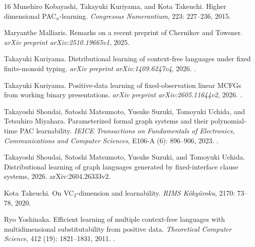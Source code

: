 \documentclass[11pt]{article}
\theoremstyle{definition}
\theoremstyle{remark}
\begin{document}
\begin{thebibliography}{16}
Munehiro Kobayashi, Takayuki Kuriyama, and Kota Takeuchi.
\newblock Higher dimensional {PAC}$_n$-learning.
\newblock \emph{Congressus Numerantium}, 223: 227--236, 2015.

Maryanthe Malliaris.
\newblock Remarks on a recent preprint of Chernikov and Towsner.
\newblock \emph{arXiv preprint arXiv:2510.19665v1}, 2025.

Takayuki Kuriyama.
\newblock Distributional learning of context-free languages under fixed
  finite-monoid typing.
\newblock \emph{arXiv preprint arXiv:1409.6247v4}, 2026.
\newblock {}.

Takayuki Kuriyama.
\newblock Positive-data learning of fixed-observation linear {MCFG}s from
  working binary presentations.
\newblock \emph{arXiv preprint arXiv:2605.11644v2}, 2026.
\newblock {}.

Takayoshi Shoudai, Satoshi Matsumoto, Yusuke Suzuki, Tomoyuki Uchida, and
Tetsuhiro Miyahara.
\newblock Parameterized formal graph systems and their polynomial-time {PAC}
  learnability.
\newblock \emph{IEICE Transactions on Fundamentals of Electronics,
  Communications and Computer Sciences}, E106-A (6):
  896--906, 2023.
\newblock {}.

Takayoshi Shoudai, Satoshi Matsumoto, Yusuke Suzuki, and Tomoyuki Uchida.
\newblock Distributional learning of graph languages generated by
  fixed-interface clause systems, 2026.
\newblock arXiv:2604.26333v2.

Kota Takeuchi.
\newblock On {VC}$_2$-dimension and learnability.
\newblock \emph{RIMS K\^{o}ky\^{u}roku}, 2170: 73--78, 2020.

Ryo Yoshinaka.
\newblock Efficient learning of multiple context-free languages with
  multidimensional substitutability from positive data.
\newblock \emph{Theoretical Computer Science}, 412 (19):
  1821--1831, 2011.
\newblock {}.

\end{thebibliography}
\end{document}

